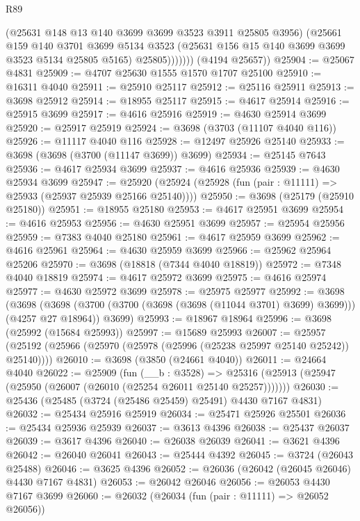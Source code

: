 \begin{lexlean}{R89}
\begin{coremodule}
                  (@25631 @148 @13 @140 @3699 @3699 @3523 @3911 @25805 @3956)
                  (@25661
                    @159
                    @140
                    @3701
                    @3699
                    @5134
                    @3523
                    (@25631 @156 @15 @140 @3699 @3699 @3523 @5134 @25805 @5165)
                    @25805)))))))
      (@4194 @25657))
@25904 := @25067 @4831
@25909 := @4707 @25630 @1555 @1570 @1707 @25100
@25910 := @16311 @4040
@25911 := @25910 @25117
@25912 := @25116 @25911
@25913 := @3698 @25912
@25914 := @18955 @25117
@25915 := @4617 @25914
@25916 := @25915 @3699
@25917 := @4616 @25916
@25919 := @4630 @25914 @3699
@25920 := @25917 @25919
@25924 := @3698 (@3703 (@11107 @4040 @116))
@25926 := @11117 @4040 @116
@25928 := @12497 @25926 @25140
@25933 := @3698 (@3698 (@3700 (@11147 @3699)) @3699)
@25934 := @25145 @7643
@25936 := @4617 @25934 @3699
@25937 := @4616 @25936
@25939 := @4630 @25934 @3699
@25947 := @25920 (@25924 (@25928 (fun (pair : @11111) => @25933 (@25937 @25939 @25166 @25140))))
@25950 := @3698 (@25179 (@25910 @25180))
@25951 := @18955 @25180
@25953 := @4617 @25951 @3699
@25954 := @4616 @25953
@25956 := @4630 @25951 @3699
@25957 := @25954 @25956
@25959 := @7383 @4040 @25180
@25961 := @4617 @25959 @3699
@25962 := @4616 @25961
@25964 := @4630 @25959 @3699
@25966 := @25962 @25964 @25206
@25970 := @3698 (@18818 (@7344 @4040 @18819))
@25972 := @7348 @4040 @18819
@25974 := @4617 @25972 @3699
@25975 := @4616 @25974
@25977 := @4630 @25972 @3699
@25978 := @25975 @25977
@25992 := @3698
    (@3698
      (@3698 (@3700 (@3700 (@3698 (@3698 (@11044 @3701) @3699) @3699))) (@4257 @27 @18964))
      @3699)
@25993 := @18967 @18964
@25996 := @3698 (@25992 (@15684 @25993))
@25997 := @15689 @25993
@26007 := @25957 (@25192 (@25966 (@25970 (@25978 (@25996 (@25238 @25997 @25140 @25242)) @25140))))
@26010 := @3698 (@3850 (@24661 @4040))
@26011 := @24664 @4040
@26022 := @25909
    (fun (__b : @3528) =>
    @25316 (@25913 (@25947 (@25950 (@26007 (@26010 (@25254 @26011 @25140 @25257)))))))
@26030 := @25436 (@25485 (@3724 (@25486 @25459) @25491) @4430 @7167 @4831)
@26032 := @25434 @25916 @25919
@26034 := @25471 @25926 @25501
@26036 := @25434 @25936 @25939
@26037 := @3613 @4396
@26038 := @25437 @26037
@26039 := @3617 @4396
@26040 := @26038 @26039
@26041 := @3621 @4396
@26042 := @26040 @26041
@26043 := @25444 @4392
@26045 := @3724 (@26043 @25488)
@26046 := @3625 @4396
@26052 := @26036 (@26042 (@26045 @26046) @4430 @7167 @4831)
@26053 := @26042 @26046
@26056 := @26053 @4430 @7167 @3699
@26060 := @26032 (@26034 (fun (pair : @11111) => @26052 @26056))

\end{coremodule}
\end{lexlean}
